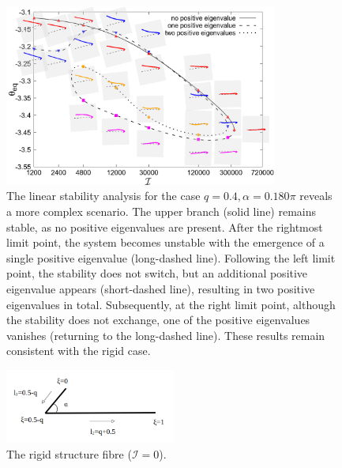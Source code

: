 \documentclass[lineno]{JFM-FLM_Au}
\begin{document}
\begin{figure}[!h]
	\begin{center}
		\includegraphics[width=0.8\textwidth]{plot/RESLT_q_0.40_alpha_0.180pi_plot_step_refine2_new_recale_FSI/combine_elastic_beam_I_theta_q_0.400_alpha_0.180pi_initial_-4.80_refine2_new_dash_line.png}
		\caption{The linear stability analysis for the case $q=0.4,\alpha=0.180\pi$ reveals a more complex scenario. The upper branch (solid line) remains stable, as no positive eigenvalues are present. After the rightmost limit point, the system becomes unstable with the emergence of a single positive eigenvalue (long-dashed line). Following the left limit point, the stability does not switch, but an additional positive eigenvalue appears (short-dashed line), resulting in two positive eigenvalues in total. Subsequently, at the right limit point, although the stability does not exchange, one of the positive eigenvalues vanishes (returning to the long-dashed line). These results remain consistent with the rigid case.}
		\label{fig:11}
	\end{center}
\end{figure}
\begin{figure}[!h]
	\begin{center}
		\includegraphics[width=0.5\textwidth]{plot/tensile_boomerang.png}
		\caption{The rigid structure fibre ($\mathcal{I}=0$).}
		\label{fig:16}
	\end{center}
\end{figure}
\end{document}
